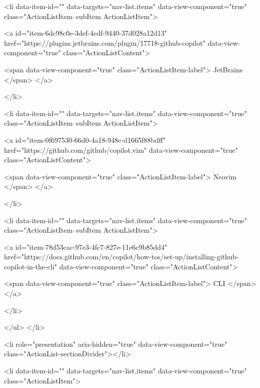           
<li data-item-id="" data-targets="nav-list.items" data-view-component="true" class="ActionListItem--subItem ActionListItem">
    
    
    <a id="item-6dc98c0e-3def-4edf-9440-37d028a12d13" href="https://plugins.jetbrains.com/plugin/17718-github-copilot" data-view-component="true" class="ActionListContent">
      
        <span data-view-component="true" class="ActionListItem-label">
          JetBrains
</span>      
</a>
  
</li>

          
<li data-item-id="" data-targets="nav-list.items" data-view-component="true" class="ActionListItem--subItem ActionListItem">
    
    
    <a id="item-0f697530-66d0-4a18-948c-d1665f88bdff" href="https://github.com/github/copilot.vim" data-view-component="true" class="ActionListContent">
      
        <span data-view-component="true" class="ActionListItem-label">
          Neovim
</span>      
</a>
  
</li>

          
<li data-item-id="" data-targets="nav-list.items" data-view-component="true" class="ActionListItem--subItem ActionListItem">
    
    
    <a id="item-78d53cac-97e3-4fc7-827e-11e6c9b85dd4" href="https://docs.github.com/en/copilot/how-tos/set-up/installing-github-copilot-in-the-cli" data-view-component="true" class="ActionListContent">
      
        <span data-view-component="true" class="ActionListItem-label">
          CLI
</span>      
</a>
  
</li>

</ul>
</li>

        
          <li role="presentation" aria-hidden="true" data-view-component="true" class="ActionList-sectionDivider"></li>
        
          
<li data-item-id="" data-targets="nav-list.items" data-view-component="true" class="ActionListItem">
    
